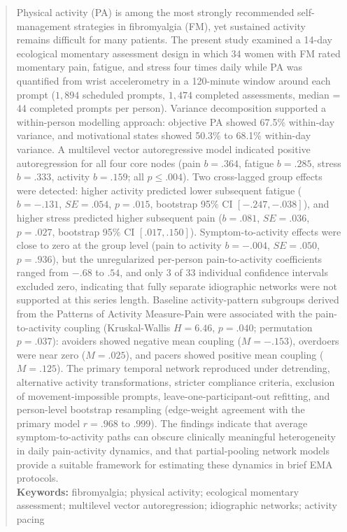 \documentclass[11pt,a4paper]{article}
\begin{document}
\begin{titlepage}
\begin{abstract}
\noindent
Physical activity (PA) is among the most strongly recommended self-management strategies in
fibromyalgia (FM), yet sustained activity remains difficult for many patients. The present
study examined a 14-day ecological momentary assessment design in which 34 women with FM
rated momentary pain, fatigue, and stress four times daily while PA was quantified from
wrist accelerometry in a 120-minute window around each prompt ($1{,}894$ scheduled prompts,
$1{,}474$ completed assessments, median = 44 completed prompts per person). Variance
decomposition supported a within-person modelling approach: objective PA showed 67.5\%
within-day variance, and motivational states showed 50.3\% to 68.1\% within-day variance. A multilevel
vector autoregressive model indicated positive autoregression for all four core nodes
(pain $b=.364$, fatigue $b=.285$, stress $b=.333$, activity $b=.159$; all $p \leq .004$).
Two cross-lagged group effects were detected: higher activity predicted lower subsequent
fatigue ($b=-.131$, $SE=.054$, $p=.015$, bootstrap 95\% CI $[-.247, -.038]$), and higher
stress predicted higher subsequent pain ($b=.081$, $SE=.036$, $p=.027$, bootstrap 95\% CI
$[.017, .150]$). Symptom-to-activity effects were close to zero at the group level
(pain to activity $b=-.004$, $SE=.050$, $p=.936$), but the unregularized per-person
pain-to-activity coefficients ranged from $-.68$ to $.54$, and only 3 of 33 individual
confidence intervals excluded zero, indicating that fully separate idiographic networks were
not supported at this series length.
Baseline activity-pattern subgroups derived from the Patterns of Activity Measure-Pain were
associated with the pain-to-activity coupling (Kruskal-Wallis $H=6.46$, $p=.040$;
permutation $p=.037$): avoiders showed negative mean coupling ($M=-.153$), overdoers were
near zero ($M=.025$), and pacers showed positive mean coupling ($M=.125$). The primary
temporal network reproduced under detrending, alternative activity transformations, stricter
compliance criteria, exclusion of movement-impossible prompts, leave-one-participant-out
refitting, and person-level bootstrap resampling (edge-weight agreement with the primary
model $r=.968$ to $.999$). The findings indicate that average symptom-to-activity paths can
obscure clinically meaningful heterogeneity in daily pain-activity dynamics, and that
partial-pooling network models provide a suitable framework for estimating these dynamics
in brief EMA protocols.\\[0.5em]
\noindent\textbf{Keywords:} fibromyalgia; physical activity; ecological momentary
assessment; multilevel vector autoregression; idiographic networks; activity pacing
\end{abstract}

\vspace*{\fill}
\end{titlepage}
\setcounter{page}{2}
\end{document}
